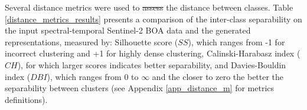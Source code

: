\documentclass[journal,article,submit,pdftex,moreauthors]{Definitions/mdpi}
\providecommand{\DIFadd}[1]{{\protect\color{blue}\uwave{#1}}} %
\providecommand{\DIFdel}[1]{{\protect\color{red}\sout{#1}}}                      %
\providecommand{\DIFaddbegin}{} %
\providecommand{\DIFaddend}{} %
\providecommand{\DIFdelbegin}{} %
\providecommand{\DIFdelend}{} %
\begin{document}

Several distance metrics were used to \DIFdelbegin \DIFdel{assess }\DIFdelend \DIFaddbegin \DIFadd{quantify }\DIFaddend the distance between classes. Table \ref{distance_metrics_results} presents a comparison of the inter-class separability on the input spectral-temporal Sentinel-2 BOA data and the generated representations, measured by: Silhouette score ($SS$), which ranges from -1 for incorrect clustering and +1 for highly dense clustering, Calinski-Harabasz index ($CH$), for which larger scores indicates better separability, and Davies-Bouldin index ($DBI$), which ranges from 0 to $\infty$ and the closer to zero the better the separability between clusters (see Appendix \ref{app_distance_m} for metrics definitions).
\end{document}

